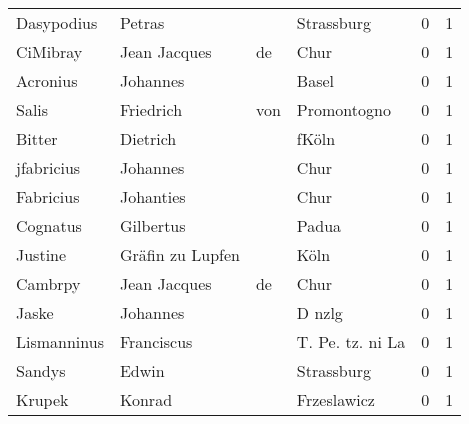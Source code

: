 \begin{center}
\begin{tiny}
\begin{longtabu}{llllrr}
               Dasypodius &                             Petras &             &                                  Strassburg &          0 &         1 \\
                 CiMibray &                       Jean Jacques &          de &                                        Chur &          0 &         1 \\
                 Acronius &                           Johannes &             &                                       Basel &          0 &         1 \\
                    Salis &                          Friedrich &         von &                                 Promontogno &          0 &         1 \\
                   Bitter &                           Dietrich &             &                                       fKöln &          0 &         1 \\
               jfabricius &                           Johannes &             &                                        Chur &          0 &         1 \\
                Fabricius &                          Johanties &             &                                        Chur &          0 &         1 \\
                 Cognatus &                          Gilbertus &             &                                       Padua &          0 &         1 \\
                  Justine &                   Gräfin zu Lupfen &             &                                        Köln &          0 &         1 \\
                  Cambrpy &                       Jean Jacques &          de &                                        Chur &          0 &         1 \\
                    Jaske &                           Johannes &             &                                      D nzlg &          0 &         1 \\
              Lismanninus &                         Franciscus &             &                            T. Pe. tz. ni La &          0 &         1 \\
                   Sandys &                              Edwin &             &                                  Strassburg &          0 &         1 \\
                   Krupek &                             Konrad &             &                                 Frzeslawicz &          0 &         1 \\

\end{longtabu}
\end{tiny}
\end{center}
